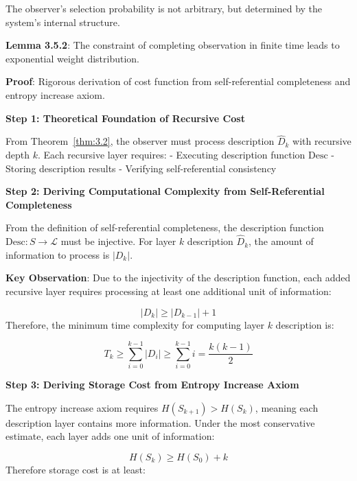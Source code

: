    The observer's selection probability is not arbitrary, but determined by the system's internal structure.
   
   \textbf{Lemma 3.5.2}: The constraint of completing observation in finite time leads to exponential weight distribution.
\label{lemma:3.5.2}
   
   \textbf{Proof}: Rigorous derivation of cost function from self-referential completeness and entropy increase axiom.
   
   \textbf{Step 1: Theoretical Foundation of Recursive Cost}
   
   From Theorem~\ref{thm:3.2}, the observer must process description $\hat{D}_k$ with recursive depth $k$. Each recursive layer requires:
   - Executing description function $\text{Desc}$
   - Storing description results
   - Verifying self-referential consistency
   
   \textbf{Step 2: Deriving Computational Complexity from Self-Referential Completeness}
   
   From the definition of self-referential completeness, the description function $\text{Desc}: S \to \mathcal{L}$ must be injective.
   For layer $k$ description $\hat{D}_k$, the amount of information to process is $|D_k|$.
   
   \textbf{Key Observation}: Due to the injectivity of the description function, each added recursive layer requires processing at least one additional unit of information:
   
\begin{equation}
|D_k| \geq |D_{k-1}| + 1
\end{equation}
   Therefore, the minimum time complexity for computing layer $k$ description is:
   
\begin{equation}
T_k \geq \sum_{i=0}^{k-1} |D_i| \geq \sum_{i=0}^{k-1} i = \frac{k(k-1)}{2}
\end{equation}

   \textbf{Step 3: Deriving Storage Cost from Entropy Increase Axiom}
   
   The entropy increase axiom requires $H(S_{k+1}) > H(S_k)$, meaning each description layer contains more information.
   Under the most conservative estimate, each layer adds one unit of information:
   
\begin{equation}
H(S_k) \geq H(S_0) + k
\end{equation}
   Therefore storage cost is at least:
   
